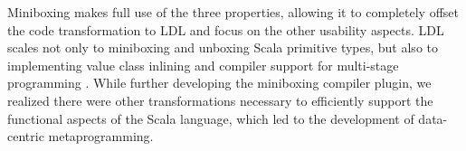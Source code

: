 %



Miniboxing makes full use of the three properties, allowing it to completely offset the code transformation to LDL and focus on the other usability aspects. LDL scales not only to miniboxing and unboxing Scala primitive types, but also to implementing value class inlining \cite{gosling-value-classes,rose-value-classes-tearing,rose-value-classes-vm} and compiler support for multi-stage programming \cite{tiark-lms, scala-virtualized}. While further developing the miniboxing compiler plugin, we realized there were other transformations necessary to efficiently support the functional aspects of the Scala language, which led to the development of data-centric metaprogramming.


